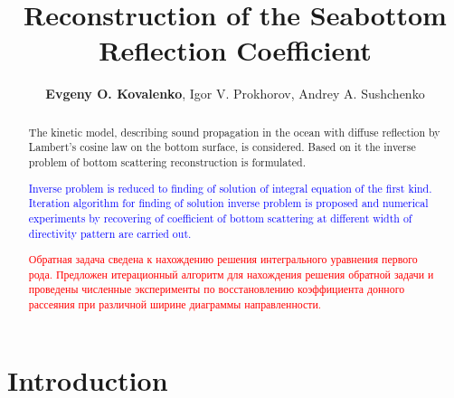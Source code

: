 \documentclass{procDDs}
\title{Reconstruction of the Seabottom Reflection Coefficient}
\author{\textbf{Evgeny O. Kovalenko}, Igor V. Prokhorov, Andrey A. Sushchenko}%
{Institute for Applied Mathematics, FEB RAS, Vladivostok, Russia, \\ 
Far Eastern Federal University, Vladivostok, Russia}                 %
{kovalenko.eo@dvfu.ru, sushchenko.aa@dvfu.ru}                                   %
\begin{document}
\maketitle

\def\k{\mathbf{k}}
\def\n{\mathbf{n}}
\def\x{\mathbf{x}}
\def\y{\mathbf{y}}
\def\r{\mathbf{r}}
\def\p{\mathbf{|}}
\def\z{\mathbf{z}}
\def\V{\mathbf{V}}
\def\Vt{\mathbf{V}t}
\def\exp{\text{exp}}

\begin{abstract}
   The kinetic model, describing sound propagation in the ocean with diffuse reflection by Lambert's cosine law on the bottom surface, is considered. Based on it the inverse problem of bottom scattering reconstruction is formulated.
   
   \textcolor{blue}{Inverse problem is reduced to finding of solution of integral equation of the first kind. Iteration algorithm for finding of solution inverse problem is proposed and numerical experiments by recovering of coefficient of bottom scattering at different width of directivity pattern are carried out.}
   
   \textcolor{red}{Обратная задача сведена к нахождению решения интегрального уравнения первого рода.
   Предложен итерационный алгоритм для нахождения решения обратной задачи и проведены численные эксперименты по восстановлению коэффициента донного рассеяния при различной ширине диаграммы направленности.} 
\end{abstract}

\section{Introduction}
\end{document}
